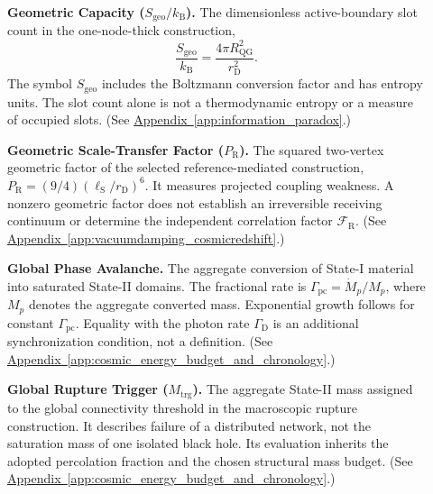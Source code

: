 \begin{description}
\item[] \begin{minipage}[t]{\linewidth}
\textbf{Geometric Capacity ($S_{\mathrm{geo}}/k_{\mathrm B}$).} The dimensionless active-boundary slot count in the one-node-thick construction,
\[
 \frac{S_{\mathrm{geo}}}{k_{\mathrm B}}
 =\frac{4\pi R_{\mathrm{QG}}^2}{r_{\mathrm D}^2}.
\]
The symbol $S_{\mathrm{geo}}$ includes the Boltzmann conversion factor and has entropy units. The slot count alone is not a thermodynamic entropy or a measure of occupied slots.
(See \hyperref[app:information_paradox]{Appendix~\ref*{app:information_paradox}}.)
\end{minipage}

\item[] \begin{minipage}[t]{\linewidth}
\textbf{Geometric Scale-Transfer Factor ($P_{\mathrm R}$).} The squared two-vertex geometric factor of the selected reference-mediated construction, $P_{\mathrm R}=(9/4)(\ell_{\mathrm S}/r_{\mathrm D})^6$. It measures projected coupling weakness. A nonzero geometric factor does not establish an irreversible receiving continuum or determine the independent correlation factor $\mathcal F_{\mathrm R}$.
(See \hyperref[app:vacuumdamping_cosmicredshift]{Appendix~\ref*{app:vacuumdamping_cosmicredshift}}.)
\end{minipage}

\item[] \begin{minipage}[t]{\linewidth}
\textbf{Global Phase Avalanche.} The aggregate conversion of State-I material into saturated State-II domains. The fractional rate is $\Gamma_{\mathrm{pc}}=\dot M_p/M_p$, where $M_p$ denotes the aggregate converted mass. Exponential growth follows for constant $\Gamma_{\mathrm{pc}}$. Equality with the photon rate $\Gamma_{\mathrm D}$ is an additional synchronization condition, not a definition.
(See \hyperref[app:cosmic_energy_budget_and_chronology]{Appendix~\ref*{app:cosmic_energy_budget_and_chronology}}.)
\end{minipage}

\item[] \begin{minipage}[t]{\linewidth}
\textbf{Global Rupture Trigger ($M_{\mathrm{trg}}$).} The aggregate State-II mass assigned to the global connectivity threshold in the macroscopic rupture construction. It describes failure of a distributed network, not the saturation mass of one isolated black hole. Its evaluation inherits the adopted percolation fraction and the chosen structural mass budget.
(See \hyperref[app:cosmic_energy_budget_and_chronology]{Appendix~\ref*{app:cosmic_energy_budget_and_chronology}}.)
\end{minipage}


\end{description}
